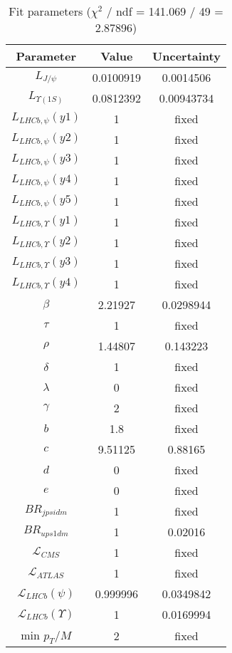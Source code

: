 \begin{table}
\centering
\begin{tabular}{c|c|c}
Parameter & Value & Uncertainty \\
\hline
$L_{J/\psi}$ & 0.0100919 & 0.0014506 \\
$L_{\Upsilon(1S)}$ & 0.0812392 & 0.00943734 \\
$L_{LHCb,\psi}(y1)$ & 1 & fixed \\
$L_{LHCb,\psi}(y2)$ & 1 & fixed \\
$L_{LHCb,\psi}(y3)$ & 1 & fixed \\
$L_{LHCb,\psi}(y4)$ & 1 & fixed \\
$L_{LHCb,\psi}(y5)$ & 1 & fixed \\
$L_{LHCb,\Upsilon}(y1)$ & 1 & fixed \\
$L_{LHCb,\Upsilon}(y2)$ & 1 & fixed \\
$L_{LHCb,\Upsilon}(y3)$ & 1 & fixed \\
$L_{LHCb,\Upsilon}(y4)$ & 1 & fixed \\
$\beta$ & 2.21927 & 0.0298944 \\
$\tau$ & 1 & fixed \\
$\rho$ & 1.44807 & 0.143223 \\
$\delta$ & 1 & fixed \\
$\lambda$ & 0 & fixed \\
$\gamma$ & 2 & fixed \\
$b$ & 1.8 & fixed \\
$c$ & 9.51125 & 0.88165 \\
$d$ & 0 & fixed \\
$e$ & 0 & fixed \\
$BR_{jpsidm}$ & 1 & fixed \\
$BR_{ups1dm}$ & 1 & 0.02016 \\
$\mathcal L_{CMS}$ & 1 & fixed \\
$\mathcal L_{ATLAS}$ & 1 & fixed \\
$\mathcal L_{LHCb}(\psi)$ & 0.999996 & 0.0349842 \\
$\mathcal L_{LHCb}(\Upsilon)$ & 1 & 0.0169994 \\
min $p_T/M$ & 2 & fixed \\
\end{tabular}
\caption{Fit parameters ($\chi^2$ / ndf = 141.069 / 49 = 2.87896)}
\end{table}
